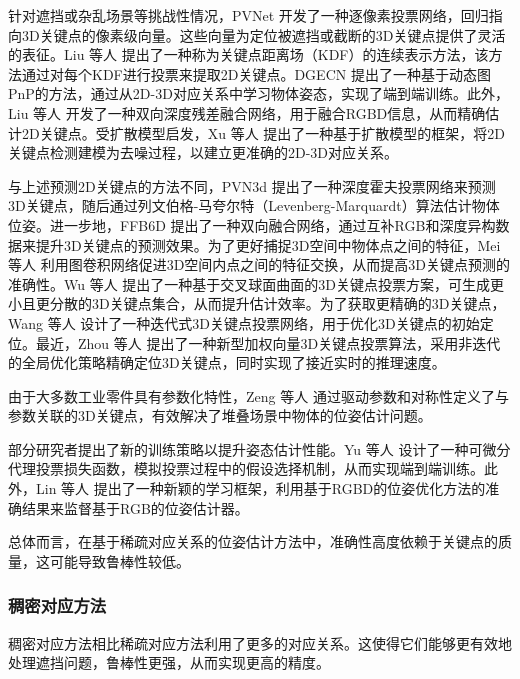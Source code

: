 \par 针对遮挡或杂乱场景等挑战性情况，PVNet\cite{peng2019pvnet} 开发了一种逐像素投票网络，回归指向3D关键点的像素级向量。这些向量为定位被遮挡或截断的3D关键点提供了灵活的表征。Liu 等人\cite{liu2021kdfnet} 提出了一种称为关键点距离场（KDF）的连续表示方法，该方法通过对每个KDF进行投票来提取2D关键点。DGECN\cite{cao2022dgecn} 提出了一种基于动态图PnP\cite{RANSAC}的方法，通过从2D-3D对应关系中学习物体姿态，实现了端到端训练。此外，Liu 等人\cite{liu2023bdr6d} 开发了一种双向深度残差融合网络，用于融合RGBD信息，从而精确估计2D关键点。受扩散模型启发，Xu 等人\cite{xu20246ddiff} 提出了一种基于扩散模型的框架，将2D关键点检测建模为去噪过程，以建立更准确的2D-3D对应关系。

\par 与上述预测2D关键点的方法不同，PVN3d\cite{he2020pvn3d} 提出了一种深度霍夫投票网络来预测3D关键点，随后通过列文伯格-马夸尔特（Levenberg-Marquardt）算法\cite{Levenberg_Marquardt}估计物体位姿。进一步地，FFB6D\cite{he2021ffb6d} 提出了一种双向融合网络，通过互补RGB和深度异构数据来提升3D关键点的预测效果。为了更好捕捉3D空间中物体点之间的特征，Mei 等人\cite{mei2022spatial} 利用图卷积网络促进3D空间内点之间的特征交换，从而提高3D关键点预测的准确性。Wu 等人\cite{wu2022vote} 提出了一种基于交叉球面曲面的3D关键点投票方案，可生成更小且更分散的3D关键点集合，从而提升估计效率。为了获取更精确的3D关键点，Wang 等人\cite{wang2023kvnet} 设计了一种迭代式3D关键点投票网络，用于优化3D关键点的初始定位。最近，Zhou 等人\cite{zhou2023deep} 提出了一种新型加权向量3D关键点投票算法，采用非迭代的全局优化策略精确定位3D关键点，同时实现了接近实时的推理速度。

\par 由于大多数工业零件具有参数化特性，Zeng 等人\cite{zeng2021parametricnet} 通过驱动参数和对称性定义了与参数关联的3D关键点，有效解决了堆叠场景中物体的位姿估计问题。

\par 部分研究者提出了新的训练策略以提升姿态估计性能。Yu 等人\cite{yu20206dof} 设计了一种可微分代理投票损失函数，模拟投票过程中的假设选择机制，从而实现端到端训练。此外，Lin 等人\cite{lin2022learning} 提出了一种新颖的学习框架，利用基于RGBD的位姿优化方法的准确结果来监督基于RGB的位姿估计器。

总体而言，在基于稀疏对应关系的位姿估计方法中，准确性高度依赖于关键点的质量，这可能导致鲁棒性较低。

\subsubsection{稠密对应方法}\label{稠密对应方法}
\par 稠密对应方法相比稀疏对应方法利用了更多的对应关系。这使得它们能够更有效地处理遮挡问题，鲁棒性更强，从而实现更高的精度。


